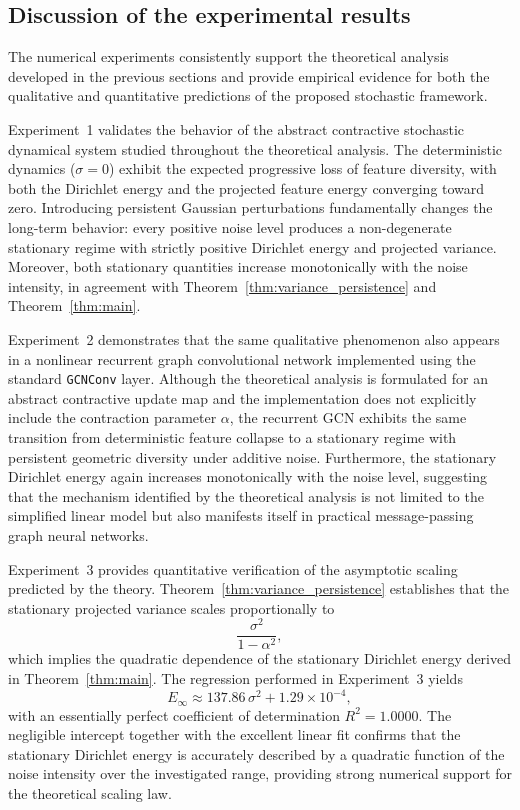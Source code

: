 \documentclass{article}
\begin{document}
\subsection{Discussion of the experimental results}

The numerical experiments consistently support the theoretical analysis
developed in the previous sections and provide empirical evidence for both
the qualitative and quantitative predictions of the proposed stochastic
framework.

Experiment~1 validates the behavior of the abstract contractive stochastic
dynamical system studied throughout the theoretical analysis.
The deterministic dynamics ($\sigma=0$) exhibit the expected progressive
loss of feature diversity, with both the Dirichlet energy and the
projected feature energy converging toward zero.
Introducing persistent Gaussian perturbations fundamentally changes the
long-term behavior: every positive noise level produces a non-degenerate
stationary regime with strictly positive Dirichlet energy and projected
variance.
Moreover, both stationary quantities increase monotonically with the noise
intensity, in agreement with
Theorem~\ref{thm:variance_persistence} and
Theorem~\ref{thm:main}.

Experiment~2 demonstrates that the same qualitative phenomenon also
appears in a nonlinear recurrent graph convolutional network implemented
using the standard \texttt{GCNConv} layer.
Although the theoretical analysis is formulated for an abstract
contractive update map and the implementation does not explicitly include
the contraction parameter $\alpha$, the recurrent GCN exhibits the same
transition from deterministic feature collapse to a stationary regime with
persistent geometric diversity under additive noise.
Furthermore, the stationary Dirichlet energy again increases
monotonically with the noise level, suggesting that the mechanism
identified by the theoretical analysis is not limited to the simplified
linear model but also manifests itself in practical message-passing graph
neural networks.

Experiment~3 provides quantitative verification of the asymptotic scaling
predicted by the theory.
Theorem~\ref{thm:variance_persistence} establishes that the stationary
projected variance scales proportionally to
\[
\frac{\sigma^2}{1-\alpha^2},
\]
which implies the quadratic dependence of the stationary Dirichlet energy
derived in Theorem~\ref{thm:main}.
The regression performed in Experiment~3 yields
\[
E_\infty
\approx
137.86\,\sigma^2
+
1.29\times10^{-4},
\]
with an essentially perfect coefficient of determination
\(
R^2=1.0000\).
The negligible intercept together with the excellent linear fit confirms
that the stationary Dirichlet energy is accurately described by a
quadratic function of the noise intensity over the investigated range,
providing strong numerical support for the theoretical scaling law.
\end{document}
